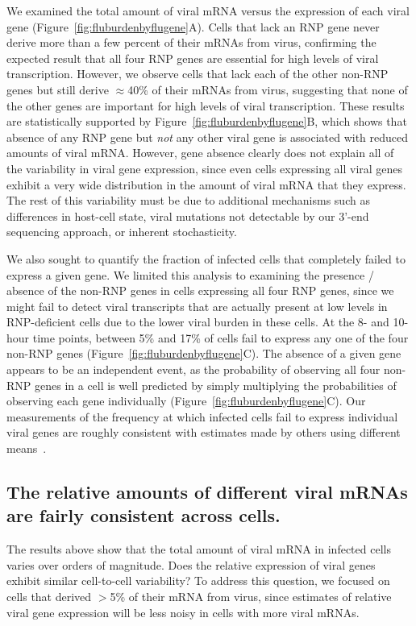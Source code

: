 \documentclass[9pt,lineno]{elife}
\begin{document}
We examined the total amount of viral mRNA versus the expression of each viral gene (Figure~\ref{fig:fluburdenbyflugene}A). 
Cells that lack an RNP gene never derive more than a few percent of their mRNAs from virus, confirming the expected result that all four RNP genes are essential for high levels of viral transcription.
However, we observe cells that lack each of the other non-RNP genes but still derive $\approx$40\% of their mRNAs from virus, suggesting that none of the other genes are important for high levels of viral transcription.
These results are statistically supported by Figure~\ref{fig:fluburdenbyflugene}B, which shows that absence of any RNP gene but \emph{not} any other viral gene is associated with reduced amounts of viral mRNA. 
However, gene absence clearly does not explain all of the variability in viral gene expression, since even cells expressing all viral genes exhibit a very wide distribution in the amount of viral mRNA that they express. 
The rest of this variability must be due to additional mechanisms such as differences in host-cell state, viral mutations not detectable by our 3'-end sequencing approach, or inherent stochasticity.  

We also sought to quantify the fraction of infected cells that completely failed to express a given gene.
We limited this analysis to examining the presence / absence of the non-RNP genes in cells expressing all four RNP genes, since we might fail to detect viral transcripts that are actually present at low levels in RNP-deficient cells due to the lower viral burden in these cells.
At the 8- and 10-hour time points, between 5\% and 17\% of cells fail to express any one of the four non-RNP genes (Figure~\ref{fig:fluburdenbyflugene}C).
The absence of a given gene appears to be an independent event, as the probability of observing all four non-RNP genes in a cell is well predicted by simply multiplying the probabilities of observing each gene individually (Figure~\ref{fig:fluburdenbyflugene}C). 
Our measurements of the frequency at which infected cells fail to express individual viral genes are roughly consistent with estimates made by others using different means~\citep{Brooke:2013kb,Dou:2017cp}.
	
\subsection{The relative amounts of different viral mRNAs are fairly consistent across cells.}
The results above show that the total amount of viral mRNA in infected cells varies over orders of magnitude.
Does the relative expression of viral genes exhibit similar cell-to-cell variability?
To address this question, we focused on cells that derived $>$5\% of their mRNA from virus, since estimates of relative viral gene expression will be less noisy in cells with more viral mRNAs.
\end{document}
